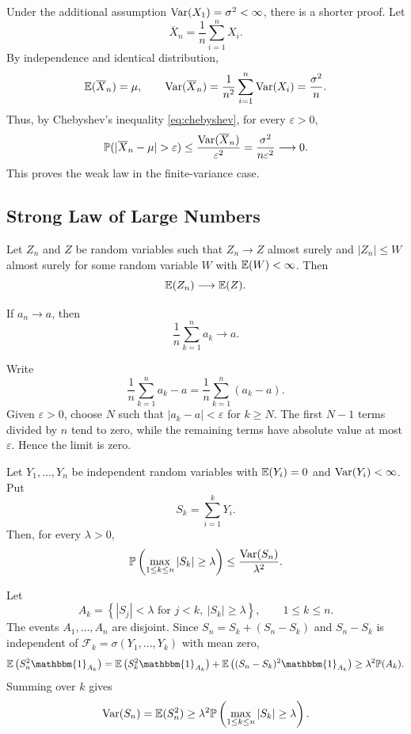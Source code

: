 \begin{remarkbox}
    Under the additional assumption $\operatorname{\mathrm{Var}}(X_1)=\sigma^2<\infty$,
    there is a shorter proof. Let
    $$\overline{X}_n=\frac{1}{n}\sum_{i=1}^{n}X_i.$$
    By independence and identical distribution,
    $$\mathbb{E}(\overline{X}_n)=\mu,\qquad
    \operatorname{\mathrm{Var}}(\overline{X}_n)=\frac{1}{n^2}\sum_{i=1}^{n}\operatorname{\mathrm{Var}}(X_i)
    =\frac{\sigma^2}{n}.$$
    Thus, by Chebyshev's inequality \eqref{eq:chebyshev}, for every $\varepsilon>0$,
    $$\PP(|\overline{X}_n-\mu|>\varepsilon)
    \leq \frac{\Var(\overline{X}_n)}{\varepsilon^2}
    =\frac{\sigma^2}{n\varepsilon^2}\longrightarrow0.$$
    This proves the weak law in the finite-variance case.
\end{remarkbox}

\subsection{Strong Law of Large Numbers}

\begin{theorembox}\label{thm:dominated-convergence}
    Let $Z_n$ and $Z$ be random variables such that $Z_n\to Z$ almost
    surely and $|Z_n|\leq W$ almost surely for some random variable
    $W$ with $\mathbb{E}(W)<\infty$. Then
    $$\mathbb{E}(Z_n)\longrightarrow\mathbb{E}(Z).$$
\end{theorembox}

\begin{lemmabox}\label{lem:cesaro}
    If $a_n\to a$, then
    $$\frac{1}{n}\sum_{k=1}^{n}a_k\longrightarrow a.$$
\end{lemmabox}
\begin{proofbox}
    Write
    $$\frac{1}{n}\sum_{k=1}^{n}a_k-a
    =\frac{1}{n}\sum_{k=1}^{n}(a_k-a).$$
    Given $\varepsilon>0$, choose $N$ such that
    $|a_k-a|<\varepsilon$ for $k\geq N$. The first $N-1$ terms
    divided by $n$ tend to zero, while the remaining terms have
    absolute value at most $\varepsilon$. Hence the limit is zero.
\end{proofbox}

\begin{propositionbox}
    \label{prop:kolmogorov-maximal}
    Let $Y_1,\ldots,Y_n$ be independent random variables with
    $\mathbb{E}(Y_i)=0$ and $\operatorname{\mathrm{Var}}(Y_i)<\infty$. Put
    $$S_k=\sum_{i=1}^{k}Y_i.$$
    Then, for every $\lambda>0$,
    $$\mathbb{P}\left(\max_{1\leq k\leq n}|S_k|\geq\lambda\right)
    \leq\frac{\operatorname{\mathrm{Var}}(S_n)}{\lambda^2}.$$
\end{propositionbox}
\begin{proofbox}
    Let
    $$A_k=\left\{|S_j|<\lambda\text{ for }j<k,\ |S_k|\geq\lambda\right\},
    \qquad 1\leq k\leq n.$$
    The events $A_1,\ldots,A_n$ are disjoint. Since
    $S_n=S_k+(S_n-S_k)$ and $S_n-S_k$ is independent of
    $\mathcal{F}_k=\sigma(Y_1,\ldots,Y_k)$ with mean zero,
    $$\EE\left(S_n^2\mathbbm{1}_{A_k}\right)
    =\EE\left(S_k^2\mathbbm{1}_{A_k}\right)
    +\EE\left((S_n-S_k)^2\mathbbm{1}_{A_k}\right)
    \geq\lambda^2\PP(A_k).$$
    Summing over $k$ gives
    $$\operatorname{\mathrm{Var}}(S_n)=\mathbb{E}(S_n^2)
    \geq\lambda^2\mathbb{P}\left(\max_{1\leq k\leq n}|S_k|\geq\lambda\right).$$
\end{proofbox}


